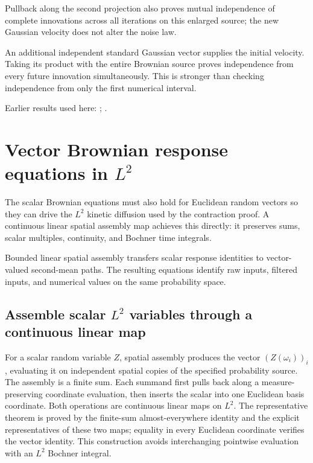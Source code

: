 \documentclass[11pt,a4paper]{report}
\begin{document}
Pullback along the second projection also proves mutual independence of complete innovations across all iterations on this enlarged source; the new Gaussian velocity does not alter the noise law.



An additional independent standard Gaussian vector supplies the initial velocity. Taking its product with the entire Brownian source proves independence from every future innovation simultaneously. This is stronger than checking independence from only the first numerical interval.



Earlier results used here: \cite[Section~3.8.16]{LangevinLean2026ULASC}; \cite[Section~3.8.17]{LangevinLean2026ULASC}.
\section{\texorpdfstring{Vector Brownian response equations in \(L^{2}\)}{Vector Brownian response equations in L²}}
\label{proof-module-KineticLangevin-VectorSegmentEquations-lean}


The scalar Brownian equations must also hold for Euclidean random vectors so they can drive the \(L^{2}\) kinetic diffusion used by the contraction proof. A continuous linear spatial assembly map achieves this directly: it preserves sums, scalar multiples, continuity, and Bochner time integrals.



Bounded linear spatial assembly transfers scalar response identities to vector-valued second-mean paths. The resulting equations identify raw inputs, filtered inputs, and numerical values on the same probability space.

\subsection{\texorpdfstring{Assemble scalar \(L^{2}\) variables through a continuous linear map}{Assemble scalar L² variables through a continuous linear map}}
\label{report-step-KineticLangevin-VectorSegmentEquations-lean-1}


For a scalar random variable \(Z\), spatial assembly produces the vector \((Z(\omega_i))_i\), evaluating it on independent spatial copies of the specified probability source. The assembly is a finite sum. Each summand first pulls back along a measure-preserving coordinate evaluation, then inserts the scalar into one Euclidean basis coordinate. Both operations are continuous linear maps on \(L^{2}\). The representative theorem is proved by the finite-sum almost-everywhere identity and the explicit representatives of these two maps; equality in every Euclidean coordinate verifies the vector identity. This construction avoids interchanging pointwise evaluation with an \(L^{2}\) Bochner integral.
\end{document}
